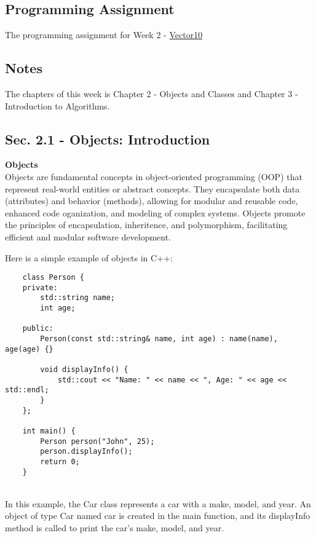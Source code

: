 \subsection{Programming Assignment}
The programming assignment for Week 2 - \href{https://github.com/cu-cspb-2270-Summer-2023/pa1-RelativiBit}{Vector10}

\subsection{Notes} 
The chapters of this week is Chapter 2 - Objects and Classes and Chapter 3 - Introduction to Algorithms. \\

\subsection*{Sec. 2.1 - Objects: Introduction}
\noindent \textbf{Objects} \\

Objects are fundamental concepts in object-oriented programming (OOP) that represent real-world entities or abstract concepts. They encapsulate both data (attributes) and behavior (methods), allowing for modular and reusable
code, enhanced code oganization, and modeling of complex systems. Objects promote the principles of encapsulation, inheritence, and polymorphism, facilitating efficient and modular software development.

\begin{solution}
    Here is a simple example of objects in C++: \\
    \horizontalline
    \begin{verbatim}
    class Person {
    private:
        std::string name;
        int age;
    
    public:
        Person(const std::string& name, int age) : name(name), age(age) {}

        void displayInfo() {
            std::cout << "Name: " << name << ", Age: " << age << std::endl;
        }
    };

    int main() {
        Person person("John", 25);
        person.displayInfo();
        return 0;
    }
    \end{verbatim} \\
    \horizontalline
    In this example, the Car class represents a car with a make, model, and year. An object of type Car named car is created in the main function, and its displayInfo method is called to print the car's make, model, and year.
\end{solution}

